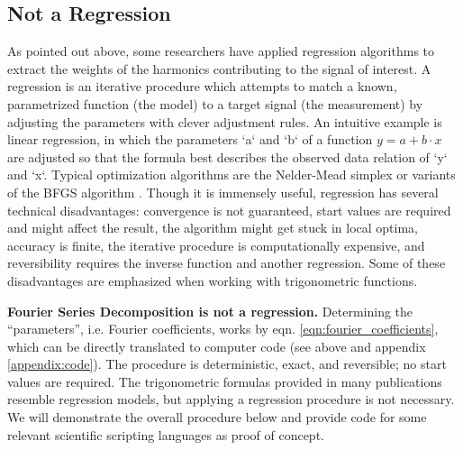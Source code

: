 \subsection{Not a Regression}
\label{sec:orged49846}
As pointed out above, some researchers have applied regression algorithms to extract the weights of the harmonics contributing to the signal of interest.
A regression is an iterative procedure which attempts to match a known, parametrized function (the model) to a target signal (the measurement) by adjusting the parameters with clever adjustment rules.
An intuitive example is linear regression, in which the parameters `a` and `b` of a function \(y=a+b\cdot x\) are adjusted so that the formula best describes the observed data relation of `y` and `x`.
Typical optimization algorithms are the Nelder-Mead simplex \citep{Nelder1965} or variants of the BFGS algorithm \citep{Broyden1970,Fletcher1970,Goldfrab1970,Shanno1970,Zhu1997}.
Though it is immensely useful, regression has several technical disadvantages: convergence is not guaranteed, start values are required and might affect the result, the algorithm might get stuck in local optima, accuracy is finite, the iterative procedure is computationally expensive, and reversibility requires the inverse function and another regression.
Some of these disadvantages are emphasized when working with trigonometric functions.


\textbf{Fourier Series Decomposition is not a regression.}
Determining the ``parameters'', i.e. Fourier coefficients, works by eqn. \eqref{eqn:fourier_coefficients}, which can be directly translated to computer code (see above and appendix \ref{appendix:code}).
The procedure is deterministic, exact, and reversible; no start values are required.
The trigonometric formulas provided in many publications resemble regression models, but applying a regression procedure is not necessary.
We will demonstrate the overall procedure below and provide code for some relevant scientific scripting languages as proof of concept.


